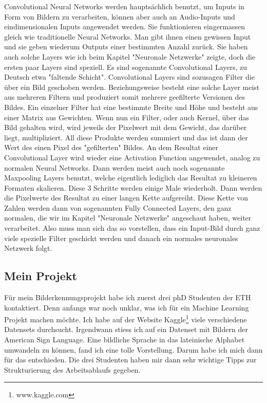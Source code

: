 \documentclass[11pt,a4paper,ngerman]{article}
\begin{document}
Convolutional Neural Networks werden hauptsächlich benutzt, um Inputs in Form von Bildern zu verarbeiten, können aber auch an Audio-Inputs und eindimensionalen Inputs angewendet werden. Sie funktionieren eingermassen gleich wie traditionelle Neural Networks. Man gibt ihnen einen gewissen Input und sie geben wiederum Outputs einer bestimmten Anzahl zurück. Sie haben auch solche Layers wie ich beim Kapitel "Neuronale Netzwerke" zeigte, doch die ersten paar Layers sind speziell. Es sind sogenannte Convolutional Layers, zu Deutsch etwa "faltende Schicht". Convolutional Layers sind sozusagen Filter die über ein Bild geschoben werden. Beziehungsweise besteht eine solche Layer meist aus mehreren Filtern und produziert somit mehrere geefilterte Versionen des Bildes. Ein einzelner Filter hat eine bestimmte Breite und Höhe und besteht aus einer Matrix aus Gewichten. Wenn nun ein Filter, oder auch Kernel, über das Bild gehalten wird, wird jeweils der Pixelwert mit dem Gewicht, das darüber liegt, multipliziert. All diese Produkte werden summiert und das ist dann der Wert des einen Pixel des "gefilterten" Bildes. An dem Resultat einer Convolutional Layer wird wieder eine Activation Function angewendet, analog zu normalen Neural Networks. Dann werden meist auch noch sogenannte Maxpooling Layers benutzt, welche eigentlich lediglich das Resultat zu kleineren Formaten skalieren. Diese 3 Schritte werden einige Male wiederholt. Dann werden die Pixelwerte des Resultat zu einer langen Kette aufgereiht. Diese Kette von Zahlen werden dann von sogenannten Fully Connected Layers, den ganz normalen, die wir im Kapitel "Neuronale Netzwerke" angeschaut haben, weiter verarbeitet. Also muss man sich das so vorstellen, dass ein Input-Bild durch ganz viele spezielle Filter geschickt werden und danach ein normales neuronales Netzwerk folgt.

\subsection{Mein Projekt}

Für mein Bilderkennungsprojekt habe ich zuerst drei phD Studenten der ETH kontaktiert. Denn anfangs war noch unklar, was ich für ein Machine Learning Projekt machen möchte. Ich habe auf der Website Kaggle\footnote{www.kaggle.com} viele verschiedene Datensets durchsucht. Irgendwann stiess ich auf ein Datenset mit Bildern der American Sign Language. Eine bildliche Sprache in das lateinische Alphabet umwandeln zu können, fand ich eine tolle Vorstellung. Darum habe ich mich dann für das entschieden. Die drei Studenten haben mir dann sehr wichtige Tipps zur Strukturierung des Arbeitsablaufs gegeben. 
\end{document}
